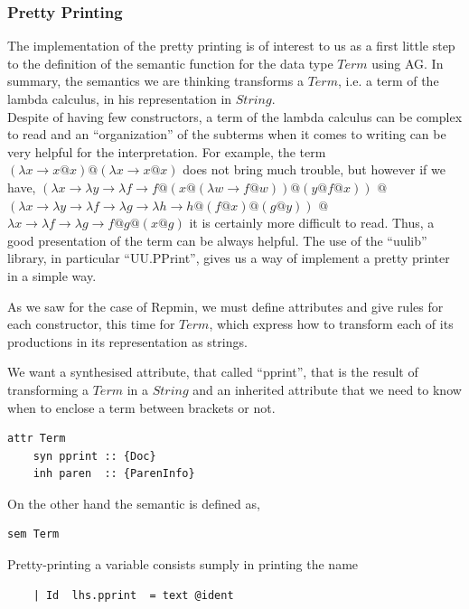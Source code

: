 \documentclass[a4paper,10pt]{article}
\begin{document}
\subsubsection{Pretty Printing}

The implementation of the pretty printing is of interest to us as a first little step to
the definition of the semantic function for the data type $Term$ using AG. In
summary, the semantics we are thinking transforms a $Term$, i.e. a term
of the lambda calculus, in his representation in $String$.\\

Despite of having few constructors, a term of the lambda calculus can be complex
to read and an ``organization'' of the subterms when it comes to writing can be
very helpful for the interpretation. For example, the term 
$(\lambda x \rightarrow x@x)@(\lambda x \rightarrow x@x)$
does not bring much trouble, but however if we have,
$(\lambda x \rightarrow
	\lambda y \rightarrow
		\lambda f \rightarrow f @ (x @ (\lambda w \rightarrow f @ w)) @ (y @ f @ x))$
$@$
$(\lambda x \rightarrow 
	\lambda y \rightarrow \lambda f \rightarrow 
	\lambda g \rightarrow \lambda h \rightarrow h @ (f @ x) @ (g @ y))$
$@$ $\lambda x \rightarrow \lambda f \rightarrow 
		\lambda g \rightarrow f @ g @ (x @ g)$
it is certainly more difficult to read. Thus, a good presentation of the term can be always
helpful. The use of the ``uulib'' library, in particular ``UU.PPrint'', gives us
a way of implement a pretty printer in a simple way.

As we saw for the case of Repmin, we must define attributes and give rules for
each constructor, this time for $Term$, which express how to transform each of its productions
in its representation as strings.

We want a synthesised attribute, that called ``pprint'', that is the result
of transforming a $Term$ in a $String$ and an inherited attribute that we need to
know when to enclose a term between brackets or not.

\begin{lstlisting}
attr Term 
    syn pprint :: {Doc}
    inh paren  :: {ParenInfo}
\end{lstlisting}

\noindent On the other hand the semantic is defined as,

\begin{lstlisting}    
sem Term
\end{lstlisting}
Pretty-printing a variable consists sumply in printing the name
\begin{lstlisting}    
    | Id  lhs.pprint  = text @ident
\end{lstlisting}
\end{document}
